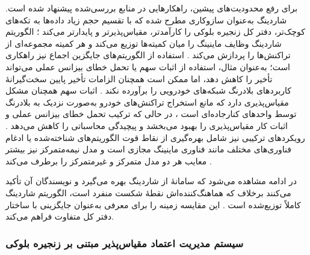 \documentclass[12pt,a4paper]{article}
\begin{document}
برای رفع محدودیت‌های پیشین، راهکار‌هایی در منابع بررسی‌شده پیشنهاد شده است. شاردینگ به‌عنوان سازوکاری مطرح شده که با تقسیم حجم زیاد داده‌ها به تکه‌های کوچک‌تر، دفتر کل زنجیره بلوکی را کارآمدتر، مقیاس‌پذیرتر و پایدارتر می‌کند \cite{ghovanlooyghajarSBTMSScalableBlockchain2021}؛ الگوریتم شاردینگ وظایف ماینینگ را میان کمیته‌ها توزیع می‌کند و هر کمیته مجموعه‌ای از تراکنش‌ها را پردازش می‌کند \cite{ghovanlooyghajarSBTMSScalableBlockchain2021}. استفاده از الگوریتم‌های جایگزین اجماع نیز راهکاری است؛ به‌عنوان مثال، استفاده از اثبات سهم یا تحمل خطای بیزانس عملی می‌تواند تأخیر را کاهش دهد، اما ممکن است همچنان الزامات تأخیر پایین سخت‌گیرانهٔ کاربرد‌های بلادرنگ شبکه‌های خودرویی را برآورده نکند \cite{razaBlockchainBasedReputationTrust2024}. اثبات سهم همچنان مشکل مقیاس‌پذیری دارد که مانع استخراج تراکنش‌های خودرو به‌صورت نزدیک به بلادرنگ توسط واحد‌های کنارجاده‌ای است \cite{ghovanlooyghajarSBTMSScalableBlockchain2021}، در حالی که ترکیب تحمل خطای بیزانس عملی و اثبات کار مقیاس‌پذیری را بهبود می‌بخشد و پیچیدگی محاسباتی را کاهش می‌دهد \cite{razaBlockchainBasedReputationTrust2024}. رویکرد‌های ترکیبی نیز شامل بهره‌گیری از نقاط قوت الگوریتم‌های شناخته‌شده یا ادغام فناوری‌های مختلف مانند فناوری ماینینگ مجازی است \cite{razaBlockchainBasedReputationTrust2024} و مدل نیمه‌متمرکز نیز بیشتر معایب هر دو مدل متمرکز و غیرمتمرکز را برطرف می‌کند \cite{razaBlockchainBasedReputationTrust2024}.

در ادامه مشاهده می‌شود که سامانهٔ  از شاردینگ بهره می‌گیرد و نویسندگان آن تأکید می‌کنند برخلاف  که هماهنگ‌کننده‌اش نقطهٔ شکست منفرد است، الگوریتم شاردینگ کاملاً توزیع‌شده است \cite{ghovanlooyghajarSBTMSScalableBlockchain2021}. این مقایسه زمینه را برای معرفی  به‌عنوان جایگزینی با ساختار دفتر کل متفاوت فراهم می‌کند.

\subsubsection{سیستم مدیریت اعتماد مقیاس‌پذیر مبتنی بر زنجیره بلوکی }
\end{document}
